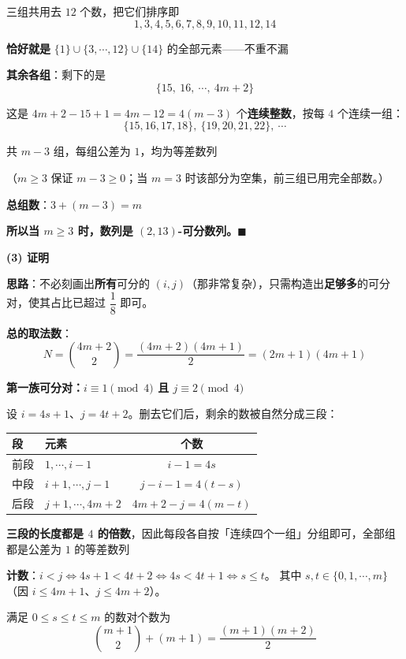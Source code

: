 三组共用去 $12$ 个数，把它们排序即
\[1,3,4,5,6,7,8,9,10,11,12,14\]

\textbf{恰好就是} $\{1\}\cup\{3,\cdots,12\}\cup\{14\}$ 的全部元素——不重不漏 

\textbf{其余各组}：剩下的是
\[\{15,\ 16,\ \cdots,\ 4m+2\}\]

这是 $4m+2-15+1=4m-12=4(m-3)$ 个\textbf{连续整数}，按每 $4$ 个连续一组：
\[\{15,16,17,18\},\ \{19,20,21,22\},\ \cdots\]

共 $m-3$ 组，每组公差为 $1$，均为等差数列 

（$m\ge3$ 保证 $m-3\ge0$；当 $m=3$ 时该部分为空集，前三组已用完全部数。）

\textbf{总组数}：$3+(m-3)=m$ 

\textbf{所以当 $m\ge3$ 时，数列是 $(2,13)$-可分数列。$\blacksquare$}

\par\medskip

\textbf{(3) 证明}

\textbf{思路}：不必刻画出\textbf{所有}可分的 $(i,j)$（那非常复杂），只需构造出\textbf{足够多}的可分对，使其占比已超过 $\dfrac18$ 即可。

\textbf{总的取法数}：
\[N=\binom{4m+2}2=\frac{(4m+2)(4m+1)}2=(2m+1)(4m+1)\]

\par\medskip

\textbf{第一族可分对：$i\equiv1\pmod 4$ 且 $j\equiv2\pmod 4$}

设 $i=4s+1$、$j=4t+2$。删去它们后，剩余的数被自然分成三段：

\begin{center}
\begin{tabular}{llc}
\toprule
段 & 元素 & 个数 \\
\midrule
前段 & $1,\cdots,i-1$ & $i-1=4s$ \\
中段 & $i+1,\cdots,j-1$ & $j-i-1=4(t-s)$ \\
后段 & $j+1,\cdots,4m+2$ & $4m+2-j=4(m-t)$ \\
\bottomrule
\end{tabular}
\end{center}

\textbf{三段的长度都是 $4$ 的倍数}，因此每段各自按「连续四个一组」分组即可，全部组都是公差为 $1$ 的等差数列 

\textbf{计数}：$i<j\iff 4s+1<4t+2\iff 4s<4t+1\iff s\le t$。
其中 $s,t\in\{0,1,\cdots,m\}$（因 $i\le4m+1$、$j\le4m+2$）。

满足 $0\le s\le t\le m$ 的数对个数为
\[\binom{m+1}2+(m+1)=\frac{(m+1)(m+2)}2\]

